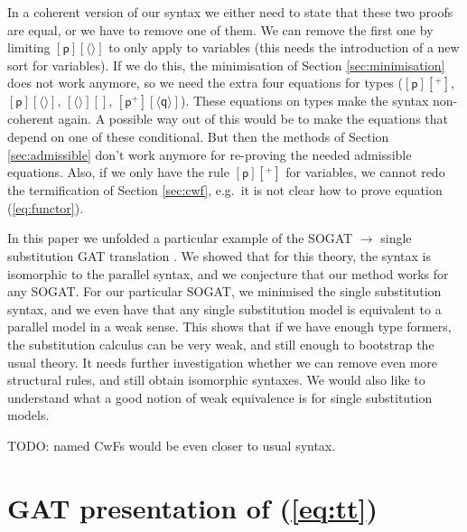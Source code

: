 \documentclass[a4paper,UKenglish,cleveref, autoref, thm-restate]{lipics-v2021}
\newcommand{\ra}{\rightarrow}
\newcommand{\p}{\mathsf{p}}
\newcommand{\q}{\mathsf{q}}
\begin{document}
In a coherent version of our syntax we either need to state that these
two proofs are equal, or we have to remove one of them. We can remove
the first one by limiting $[\p][\langle\rangle]$ to only apply to
variables (this needs the introduction of a new sort for
variables). If we do this, the minimisation of Section
\ref{sec:minimisation} does not work anymore, so we need the extra
four equations for types ($[\p][^+]$, $[\p][\langle\rangle]$,
$[\langle\rangle][]$, $[\p^+][\langle\q\rangle]$). These equations on
types make the syntax non-coherent again. A possible way out of this
would be to make the equations that depend on one of these 
 conditional. But then the methods of Section
\ref{sec:admissible} don't work anymore for re-proving the needed
admissible equations. Also, if we only have the rule $[\p][^+]$ for
variables, we cannot redo the termification of Section
\ref{sec:cwf}, e.g.\ it is not clear how to prove equation
(\ref{eq:functor}).

In this paper we unfolded a particular example of the SOGAT $\ra$
single substitution GAT translation
\cite{DBLP:conf/fscd/KaposiX24}. We showed that for this theory, the
syntax is isomorphic to the parallel syntax, and we conjecture that
our method works for any SOGAT. For our particular SOGAT, we minimised the single
substitution syntax, and we even have that any
single substitution model is equivalent to a parallel model in a weak
sense. This shows that if we have enough type formers, the
substitution calculus can be very weak, and still enough to bootstrap
the usual theory. It needs further investigation whether we can remove
even more structural rules, and still obtain isomorphic syntaxes. We
would also like to understand what a good notion of weak equivalence
is for single substitution models.

TODO: named CwFs would be even closer to usual syntax.



\appendix

\section{GAT presentation of (\ref{eq:tt})}
\label{app:tt}
\end{document}
